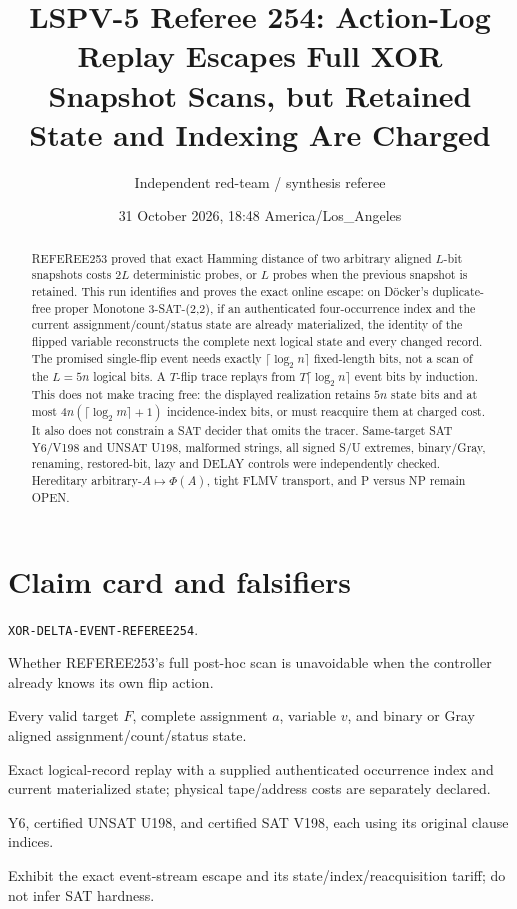 \documentclass[11pt]{article}
\title{LSPV-5 Referee 254: Action-Log Replay Escapes Full XOR Snapshot Scans, but Retained State and Indexing Are Charged}
\author{Independent red-team / synthesis referee}
\date{31 October 2026, 18:48 America/Los\_Angeles}
\newcommand{\status}[1]{\textsf{#1}}
\begin{document}
\maketitle

\begin{abstract}
REFEREE253 proved that exact Hamming distance of two arbitrary aligned $L$-bit snapshots costs $2L$ deterministic probes, or $L$ probes when the previous snapshot is retained.  This run identifies and proves the exact online escape: on D\"ocker's duplicate-free proper Monotone 3-SAT-(2,2), if an authenticated four-occurrence index and the current assignment/count/status state are already materialized, the identity of the flipped variable reconstructs the complete next logical state and every changed record.  The promised single-flip event needs exactly $\lceil\log_2 n\rceil$ fixed-length bits, not a scan of the $L=5n$ logical bits.  A $T$-flip trace replays from $T\lceil\log_2n\rceil$ event bits by induction.  This does not make tracing free: the displayed realization retains $5n$ state bits and at most $4n(\lceil\log_2m\rceil+1)$ incidence-index bits, or must reacquire them at charged cost.  It also does not constrain a SAT decider that omits the tracer.  Same-target SAT Y6/V198 and UNSAT U198, malformed strings, all signed S/U extremes, binary/Gray, renaming, restored-bit, lazy and DELAY controls were independently checked.  Hereditary arbitrary-$A\mapsto\Phi(A)$, tight FLMV transport, and P versus NP remain \status{OPEN}.
\end{abstract}

\section{Claim card and falsifiers}
\begin{description}[leftmargin=3cm]
\item[Claim ID.] \texttt{XOR-DELTA-EVENT-REFEREE254}.
\item[Exact obstruction.] Whether REFEREE253's full post-hoc scan is unavoidable when the controller already knows its own flip action.
\item[Quantifiers.] Every valid target $F$, complete assignment $a$, variable $v$, and binary or Gray aligned assignment/count/status state.
\item[Model.] Exact logical-record replay with a supplied authenticated occurrence index and current materialized state; physical tape/address costs are separately declared.
\item[SAME\_REALIZATION.] Y6, certified UNSAT U198, and certified SAT V198, each using its original clause indices.
\item[Weakest useful theorem.] Exhibit the exact event-stream escape and its state/index/reacquisition tariff; do not infer SAT hardness.
\end{description}
\end{document}
